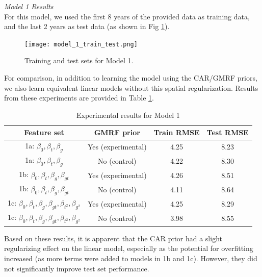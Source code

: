 \documentclass[journal]{IEEEtran}
\begin{document}
\noindent\emph{Model 1 Results} \\

For this model, we used the first 8 years of the provided data as training data, and the last 2 years as test data (as shown in Fig \ref{fig:model_1_train_test}).

\begin{figure}[h!]
    \centering
    \texttt{[image: model\_1\_train\_test.png]}
    \caption{Training and test sets for Model 1.}
    \label{fig:model_1_train_test}
\end{figure}

For comparison, in addition to learning the model using the CAR/GMRF priors, we also learn equivalent linear models without this spatial regularization. Results from these experiments are provided in Table \ref{tab:model_1_results}.







\begin{table}[h!]
    \centering
    \begin{tabular}{|c|c|c|c|}
        \hline
        Feature set & GMRF prior & Train RMSE & Test RMSE \\
        \hline
        1a: $\beta_0, \beta_t, \beta_g$ & Yes (experimental) & 4.25 & 8.23  \\
        \hline
        1a: $\beta_0, \beta_t, \beta_g$ & No (control) & 4.22 & 8.30  \\
        \hline
        1b: $\beta_0, \beta_t, \beta_g, \beta_{gt}$ & Yes (experimental) & 4.26 & 8.51 \\
        \hline
        1b: $\beta_0, \beta_t, \beta_g, \beta_{gt}$ & No (control) & 4.11 & 8.64 \\
        \hline
        1c: $\beta_0, \beta_t, \beta_g, \beta_{gt}, \beta_{t^2}, \beta_{g^2}$ & Yes (experimental) & 4.25 & 8.29  \\
        \hline
        1c: $\beta_0, \beta_t, \beta_g, \beta_{gt}, \beta_{t^2}, \beta_{g^2}$ & No (control) & 3.98 & 8.55 \\
        \hline
    \end{tabular}
    \caption{Experimental results for Model 1}
    \label{tab:model_1_results}
\end{table}

Based on these results, it is apparent that the CAR prior had a slight regularizing effect on the linear model, especially as the potential for overfitting increased (as more terms were added to models in 1b and 1c). However, they did not significantly improve test set performance.
\end{document}
